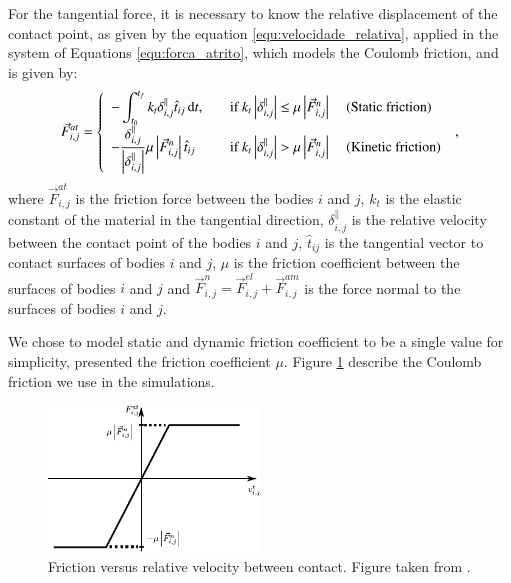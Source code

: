     For the tangential force, it is necessary to know the relative displacement of the contact point, as given by the equation \ref{equ:velocidade_relativa}, applied in the system of Equations \ref{equ:forca_atrito}, which models the Coulomb friction, and is given by:
\begin{equation}
    \label{equ:forca_atrito}
    \vec{F}_{i,j}^{at} = \left\{
    \begin{array}{l l l}
        \displaystyle -\int_{t_{0}}^{t_{f}} k_{t} \delta_{i,j}^{\parallel} \hat{t}_{ij}\, \mathrm{d} t, & \quad \textrm{if } k_{t} \left| \delta_{i,j}^{\parallel} \right| \leq \mu \left|\vec{F}_{i,j}^{n}\right| & \textrm{ (Static friction)} \\
        \displaystyle -\frac{\delta_{i,j}^{\parallel}}{\left|\delta_{i,j}^{\parallel}\right|} \mu \left| \vec{F}_{i,j}^{n} \right| \hat{t}_{ij}\, & \quad \textrm{if } k_{t} \left| \delta_{i,j}^{\parallel} \right| > \mu \left| \vec{F}_{i,j}^{n} \right| & \textrm{ (Kinetic friction)}
    \end{array}
    \right.\ ,
\end{equation}
where $\vec{F}_{i,j}^{at}$ is the friction force between the bodies $i$ and $j$, $k_{t}$ is the elastic constant of the material in the tangential direction, $\delta_{i,j}^{\parallel}$ is the relative velocity between the contact point of the bodies $i$ and $j$, $\hat{t}_{ij}$ is the tangential vector to contact surfaces of bodies $i$ and $j$, $\mu$ is the friction coefficient between the surfaces of bodies $i$ and $j$ and $\vec{F}_{i,j}^{n} = \vec{F}_{i,j}^{el} +\vec{F}_{i,j}^{am}$ is the force normal to the surfaces of bodies $i$ and $j$.

    We chose to model static and dynamic friction coefficient to be a single value for simplicity, presented the friction coefficient $\mu$. Figure \ref{fig:atrito} describe the Coulomb friction we use in the simulations.

\begin{figure}[H]
    \centering
    \includegraphics[width=0.5\textwidth]{04-figuras/Atrito.pdf}
    \caption[Friction.]{Friction versus relative velocity between contact. Figure taken from \cite{Caio-Tese}.}
    \label{fig:atrito}
\end{figure}

